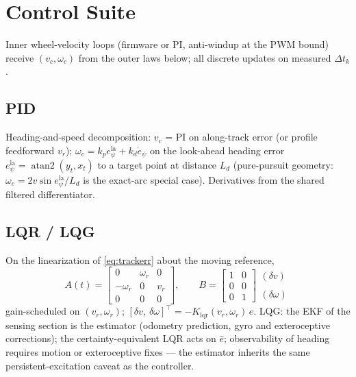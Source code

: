 \documentclass[conference]{IEEEtran}
\begin{document}
\section{Control Suite}
Inner wheel-velocity loops (firmware or PI, anti-windup at the PWM bound) receive $(v_c,\omega_c)$ from the outer laws below; all discrete updates on measured $\Delta t_k$.

\subsection{PID}
Heading-and-speed decomposition: $v_c$ = PI on along-track error (or profile feedforward $v_r$); $\omega_c = k_p e_\psi^{\mathrm{la}} + k_d\dot e_\psi$ on the look-ahead heading error $e_\psi^{\mathrm{la}} = \operatorname{atan2}(y_t, x_t)$ to a target point at distance $L_d$ (pure-pursuit geometry: $\omega_c = 2v\sin e_\psi^{\mathrm{la}}/L_d$ is the exact-arc special case). Derivatives from the shared filtered differentiator.

\subsection{LQR / LQG}
On the linearization of \eqref{eq:trackerr} about the moving reference,
\begin{equation}
A(t) = \begin{bmatrix}0&\omega_r&0\\ -\omega_r&0&v_r\\ 0&0&0\end{bmatrix},\qquad
B = \begin{bmatrix}1&0\\0&0\\0&1\end{bmatrix}\!\!\begin{array}{l}\scriptstyle(\delta v)\\ \\ \scriptstyle(\delta\omega)\end{array}
\end{equation}
gain-scheduled on $(v_r,\omega_r)$; $[\delta v,\ \delta\omega]^{\!\top} = -K_{\mathrm{lqr}}(v_r,\omega_r)\,e$. LQG: the EKF of the sensing section is the estimator (odometry prediction, gyro and exteroceptive corrections); the certainty-equivalent LQR acts on $\hat e$; observability of heading requires motion or exteroceptive fixes --- the estimator inherits the same persistent-excitation caveat as the controller.
\end{document}
